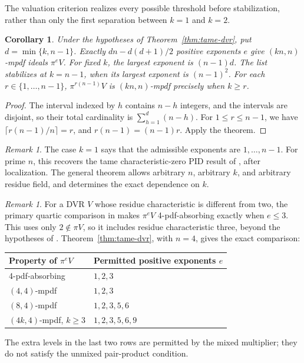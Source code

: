 \documentclass[11pt,a4paper]{amsart}
\newtheorem{corollary}[theorem]{Corollary}
\theoremstyle{definition}
\theoremstyle{remark}
\newtheorem{remark}[theorem]{Remark}
\numberwithin{equation}{section}
\begin{document}
The valuation criterion realizes every possible threshold before
stabilization, rather than only the first separation between $k=1$ and
$k=2$.

\begin{corollary} \label{cor:hierarchy}
Under the hypotheses of Theorem~\ref{thm:tame-dvr}, put
$d=\min\{k,n-1\}$. Exactly $dn-d(d+1)/2$ positive exponents $e$ give
$(kn,n)$-mpdf ideals $\pi^eV$. For fixed $k$, the largest exponent is $(n-1)d$. The list stabilizes at
$k=n-1$, when its largest exponent is $(n-1)^2$. For each $r\in\{1,\ldots,n-1\}$,
$\pi^{r(n-1)}V$ is $(kn,n)$-mpdf precisely when $k\ge r$.
\end{corollary}
\begin{proof}
The interval indexed by $h$ contains $n-h$ integers, and the intervals are
disjoint, so their total cardinality is $\sum_{h=1}^d(n-h)$.
For $1\le r\le n-1$, we have
$\lceil r(n-1)/n\rceil=r$, and $r(n-1)=(n-1)r$.
Apply the theorem.
\end{proof}

\begin{remark}
The case $k=1$ says that the admissible exponents are $1,\ldots,n-1$.
For prime $n$, this recovers the tame characteristic-zero PID result of
\cite[Theorem~3]{Yes}, after localization. The general theorem allows
arbitrary $n$, arbitrary $k$, and arbitrary residue field, and determines
the exact dependence on $k$.
\end{remark}

\begin{remark}\label{quartic:dvr-comparison}
For a DVR $V$ whose residue characteristic is different from two,
the primary quartic comparison in \cite[Theorem~3.17]{TS} makes $\pi^eV$
4-pdf-absorbing exactly when $e\le3$. This uses only $2\notin\pi V$,
so it includes residue characteristic three, beyond the hypotheses
of \cite[Theorem~4.6]{TAHA}. Theorem~\ref{thm:tame-dvr}, with $n=4$,
gives the exact comparison:
\begin{center}
\begin{tabular}{@{}ll@{}}
\toprule
Property of $\pi^eV$ & Permitted positive exponents $e$\\
\midrule
4-pdf-absorbing & $1,2,3$\\
$(4,4)$-mpdf & $1,2,3$\\
$(8,4)$-mpdf & $1,2,3,5,6$\\
$(4k,4)$-mpdf, $k\ge3$ & $1,2,3,5,6,9$\\
\bottomrule
\end{tabular}
\end{center}
The extra levels in the last two rows are permitted by the mixed
multiplier; they do not satisfy the unmixed pair-product condition.
\end{remark}
\end{document}
